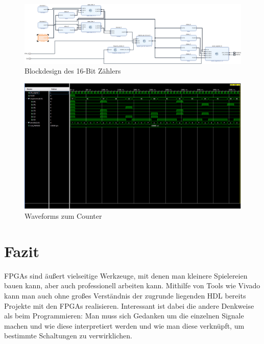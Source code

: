 \documentclass[11pt, a4paper]{article}
\begin{document}
\begin{figure}[H]    
    \centering
    \includegraphics[width=\linewidth]{versuch7Data/counter.pdf}
    \caption{Blockdesign des 16-Bit Zählers}
    \label{aufbauZähler}        
\end{figure}
\begin{figure}[H]    
    \centering
    \includegraphics[width=\linewidth]{versuch7Data/counter.png}
    \caption{Waveforms zum Counter}
    \label{waveformCounter}        
\end{figure}

\section*{Fazit}
FPGAs sind äußert vielseitige Werkzeuge, mit denen man kleinere Spielereien bauen kann, aber auch professionell arbeiten kann. Mithilfe von Tools wie Vivado kann man auch ohne großes Verständnis der zugrunde liegenden HDL bereits Projekte mit den FPGAs realisieren. Interessant ist dabei die andere Denkweise als beim Programmieren: Man muss sich Gedanken um die einzelnen Signale machen und wie diese interpretiert werden und wie man diese verknüpft, um bestimmte Schaltungen zu verwirklichen.
\end{document}

